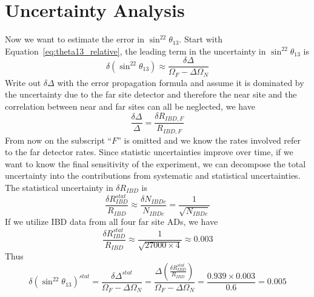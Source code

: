 \section{Uncertainty Analysis}
Now we want to estimate the error in $\sin^22\theta_{13}$. Start with Equation~\ref{eq:theta13_relative}, the leading term in the uncertainty in $\sin^22\theta_{13}$ is
\begin{equation}
	\delta(\sin^22\theta_{13})\approx\frac{\delta\Delta}{\Omega_F-\Delta\Omega_N}
\end{equation}
Write out $\delta\Delta$ with the error propagation formula and assume it is dominated by the uncertainty due to the far site detector and therefore the near site and the correlation between near and far sites can all be neglected, we have
\begin{equation}
	\frac{\delta\Delta}{\Delta}=\frac{\delta R_{IBD,F}}{R_{IBD,F}}
\end{equation}
From now on the subscript ``$F$'' is omitted and we know the rates involved refer to the far detector rates. Since statistic uncertainties improve over time, if we want to know the final sensitivity of the experiment, we can decompose the total uncertainty into the contributions from systematic and statistical uncertainties. The statistical uncertainty in $\delta R_{IBD}$ is
\begin{equation}
	\frac{\delta R_{IBD}^{stat}}{R_{IBD}}\approx\frac{\delta N_{IBDc}}{N_{IBDc}}=\frac{1}{\sqrt{N_{IBDc}}}
\end{equation}
If we utilize IBD data from all four far site ADs, we have
\begin{equation}
	\frac{\delta R_{IBD}^{stat}}{R_{IBD}}\approx\frac{1}{\sqrt{27000\times 4}}\approx 0.003
\end{equation}
Thus
\begin{equation}
	\delta(\sin^22\theta_{13})^{stat}=\frac{\delta\Delta^{stat}}{\Omega_F-\Delta\Omega_N}=\frac{\Delta\left(\frac{\delta R_{IBD}^{stat}}{R_{IBD}}\right)}{\Omega_F-\Delta\Omega_N}=\frac{0.939\times 0.003}{0.6}=0.005
\end{equation}

